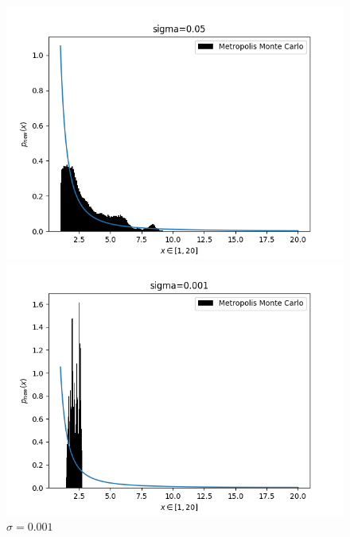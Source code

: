 \documentclass[12pt]{article}
\begin{document}
\begin{figure}[h]
    \centering
    \begin{minipage}{0.47\textwidth}
        \includegraphics[width=1.2\textwidth]{figures/ex3_sigma005.png}
        \caption{$\sigma = 0.05$}
    \end{minipage}
    \hfill
    \begin{minipage}{0.47\textwidth}
        \includegraphics[width=1.2\textwidth]{figures/ex3_sigma0001.png}
        \caption{$\sigma = 0.001$}
    \end{minipage}
\end{figure}
\end{document}

